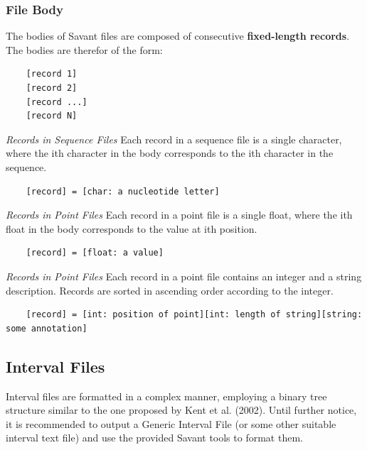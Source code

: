 \documentclass{report}
\begin{document}
\subsubsection{File Body}

The bodies of Savant files are composed of consecutive {\bf fixed-length records}. The bodies are therefor of the form:
\begin{verbatim}
	[record 1]
	[record 2]
	[record ...]
	[record N]
\end{verbatim}

{\it Records in Sequence Files} Each record in a sequence file is a single character, where the ith character in the body corresponds to the ith character in the sequence.

\begin{verbatim}
	[record] = [char: a nucleotide letter]
\end{verbatim}

{\it Records in Point Files} Each record in a point file is a single float, where the ith float in the body corresponds to the value at ith position.

\begin{verbatim}
	[record] = [float: a value]
\end{verbatim}

{\it Records in Point Files} Each record in a point file contains an integer and a string description. Records are sorted in ascending order according to the integer.
\begin{verbatim}
	[record] = [int: position of point][int: length of string][string: some annotation]
\end{verbatim}

\subsection{Interval Files}

Interval files are formatted in a complex manner, employing a binary tree structure similar to the one proposed by Kent et al. (2002). Until further notice, it is recommended to output a Generic Interval File (or some other suitable interval text file) and use the provided Savant tools to format them.
\end{document}
